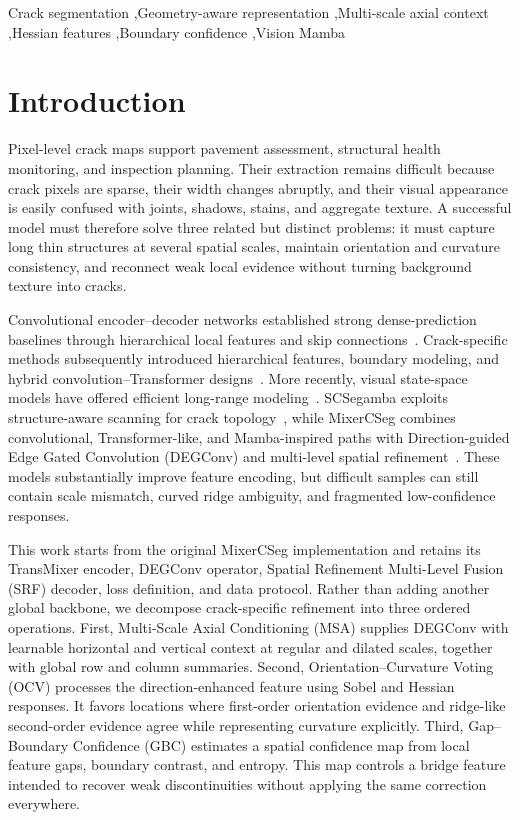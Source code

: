 \documentclass[preprint,12pt]{elsarticle}
\begin{document}
\begin{frontmatter}
\begin{keyword}
Crack segmentation \sep Geometry-aware representation \sep Multi-scale axial context \sep Hessian features \sep Boundary confidence \sep Vision Mamba
\end{keyword}

\end{frontmatter}

\section{Introduction}
\label{sec:introduction}

Pixel-level crack maps support pavement assessment, structural health monitoring, and inspection planning. Their extraction remains difficult because crack pixels are sparse, their width changes abruptly, and their visual appearance is easily confused with joints, shadows, stains, and aggregate texture. A successful model must therefore solve three related but distinct problems: it must capture long thin structures at several spatial scales, maintain orientation and curvature consistency, and reconnect weak local evidence without turning background texture into cracks.

Convolutional encoder--decoder networks established strong dense-prediction baselines through hierarchical local features and skip connections~\cite{long2015fcn,ronneberger2015unet}. Crack-specific methods subsequently introduced hierarchical features, boundary modeling, and hybrid convolution--Transformer designs~\cite{zou2019deepcrack,guo2021barnet,xiang2023dtrcnet}. More recently, visual state-space models have offered efficient long-range modeling~\cite{gu2024mamba,liu2024vmamba}. SCSegamba exploits structure-aware scanning for crack topology~\cite{liu2025scsegamba}, while MixerCSeg combines convolutional, Transformer-like, and Mamba-inspired paths with Direction-guided Edge Gated Convolution (DEGConv) and multi-level spatial refinement~\cite{zhao2026mixercseg}. These models substantially improve feature encoding, but difficult samples can still contain scale mismatch, curved ridge ambiguity, and fragmented low-confidence responses.

This work starts from the original MixerCSeg implementation and retains its TransMixer encoder, DEGConv operator, Spatial Refinement Multi-Level Fusion (SRF) decoder, loss definition, and data protocol. Rather than adding another global backbone, we decompose crack-specific refinement into three ordered operations. First, Multi-Scale Axial Conditioning (MSA) supplies DEGConv with learnable horizontal and vertical context at regular and dilated scales, together with global row and column summaries. Second, Orientation--Curvature Voting (OCV) processes the direction-enhanced feature using Sobel and Hessian responses. It favors locations where first-order orientation evidence and ridge-like second-order evidence agree while representing curvature explicitly. Third, Gap--Boundary Confidence (GBC) estimates a spatial confidence map from local feature gaps, boundary contrast, and entropy. This map controls a bridge feature intended to recover weak discontinuities without applying the same correction everywhere.
\end{document}
